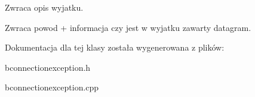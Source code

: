 Zwraca opis wyjatku. \begin{DoxyReturn}{Zwraca}
powod + informacja czy jest w wyjatku zawarty datagram. 
\end{DoxyReturn}


Dokumentacja dla tej klasy została wygenerowana z plików:\begin{DoxyCompactItemize}
\item 
bconnectionexception.h\item 
bconnectionexception.cpp\end{DoxyCompactItemize}
